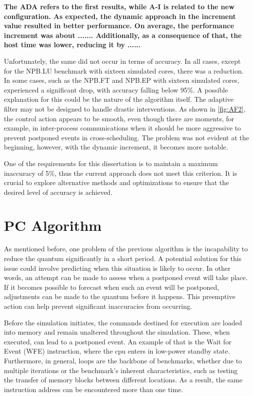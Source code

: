 \textbf{The ADA refers to the first results, while A-I is related to the new configuration. As expected, the dynamic approach in the increment 
value resulted in better performance. On average, the performance increment was about ....... Additionally, as a consequence of that, the host 
time was lower, reducing it by ...... }

Unfortunately, the same did not occur in terms of accuracy. In all cases, except for the NPB.LU benchmark with sixteen simulated cores, 
there was a reduction. In some cases, such as the NPB.FT and NPB.EP with sixteen simulated cores, experienced a significant drop, with accuracy 
falling below 95\%. A possible explanation for this could be the nature of the algorithm itself. The adaptive filter may not be designed to 
handle drastic interventions. As shown in \autoref{fig:AF2}, the control action appears to be smooth, even though there are moments, for example, 
in inter-process communications when it should be more aggressive to prevent postponed events in cross-scheduling. The problem was not evident at 
the beginning, however, with the dynamic increment, it becomes more notable. 

One of the requirements for this dissertation is to maintain a maximum inaccuracy of 5\%, thus the current approach does not meet this criterion. 
It is crucial to explore alternative methods and optimizations to ensure that the desired level of accuracy is achieved.

\section{PC Algorithm}

As mentioned before, one problem of the previous algorithm is the incapability to reduce the quantum significantly in a short period. A potential 
solution for this issue could involve predicting when this situation is likely to occur. In other words, an attempt can be made to assess when a 
postponed event will take place. If it becomes possible to forecast when such an event will be postponed, adjustments can be made to the quantum 
before it happens. This preemptive action can help prevent significant inaccuracies from occurring. 

Before the simulation initiates, the commands destined for execution are loaded into memory and remain unaltered throughout the simulation. These, 
when executed, can lead to a postponed event. An example of that is the Wait for Event (WFE) instruction, where the \gls{cpu} enters in low-power 
standby state. Furthermore, in general, loops are the backbone of benchmarks, whether due to multiple iterations or the benchmark's inherent 
characteristics, such as testing the transfer of memory blocks between different locations. As a result, the same instruction address can be 
encountered more than one time. 

